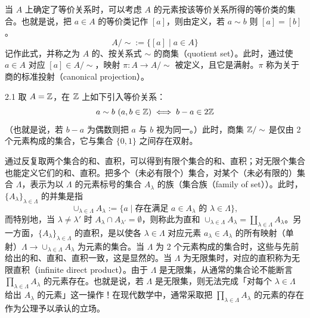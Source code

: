 
当 $A$ 上确定了等价关系时，可以考虑 $A$ 的元素按该等价关系所得的等价类的集合。也就是说，把 $a\in A$ 的等价类记作 $[a]$，则由定义，若 $a\sim b$ 则 $[a]=[b]$。
\[
  A/{\sim} := \{[a] \mid a\in A\}
\]
记作此式，并称之为 $A$ 的、按关系式 $\sim$ 的商集（quotient set）。此时，通过使 $a\in A$ 对应 $[a]\in A/{\sim}$，映射 $\pi\colon A\to A/{\sim}$ 被定义，且它是满射。$\pi$ 称为关于商的标准投射（canonical projection）。

\begin{example}{2.1} 取 $A=\mathbb{Z}$，在 $\mathbb{Z}$ 上如下引入等价关系：
\[
  a\sim b\ (a,b\in\mathbb{Z}) \iff b-a\in 2\mathbb{Z}
\]
（也就是说，若 $b-a$ 为偶数则把 $a$ 与 $b$ 视为同一。）此时，商集 $\mathbb{Z}/\sim$ 是仅由 2 个元素构成的集合，它与集合 $\{0,1\}$ 之间存在双射。\end{example}


通过反复取两个集合的和、直积，可以得到有限个集合的和、直积；对无限个集合也能定义它们的和、直积。把多个（未必有限个）集合，对某个（未必有限的）集合 $\Lambda$，表示为以 $\Lambda$ 的元素标号的集合 $A_\lambda$ 的族（集合族（family of set））。此时，$\{A_\lambda\}_{\lambda\in\Lambda}$ 的并集是指
\[
  \cup_{\lambda\in\Lambda}A_\lambda := \{a \mid \text{存在满足 } a\in A_\lambda \text{ 的 } \lambda\in\Lambda\},
\]
而特别地，当 $\lambda\neq\lambda'$ 时 $A_\lambda\cap A_{\lambda'}=\emptyset$，则称此为直和 $\cup_{\lambda\in\Lambda}A_\lambda=\coprod_{\lambda\in\Lambda}A_\lambda$。另一方面，$\{A_\lambda\}_{\lambda\in\Lambda}$ 的直积，是以使各 $\lambda\in\Lambda$ 对应元素 $a_\lambda\in A_\lambda$ 的所有映射（单射）$\Lambda\to\cup_{\lambda\in\Lambda}A_\lambda$ 为元素的集合。当 $\Lambda$ 为 2 个元素构成的集合时，这些与先前给出的和、直和、直积一致，这是显然的。当 $\Lambda$ 为无限集时，对应的直积称为无限直积（infinite direct product）。由于 $\Lambda$ 是无限集，从通常的集合论不能断言 $\prod_{\lambda\in\Lambda}A_\lambda$ 的元素存在。也就是说，若 $\Lambda$ 是无限集，则无法完成「对每个 $\lambda\in\Lambda$ 给出 $A_\lambda$ 的元素」这一操作！在现代数学中，通常采取把 $\prod_{\lambda\in\Lambda}A_\lambda$ 的元素的存在作为公理予以承认的立场。

